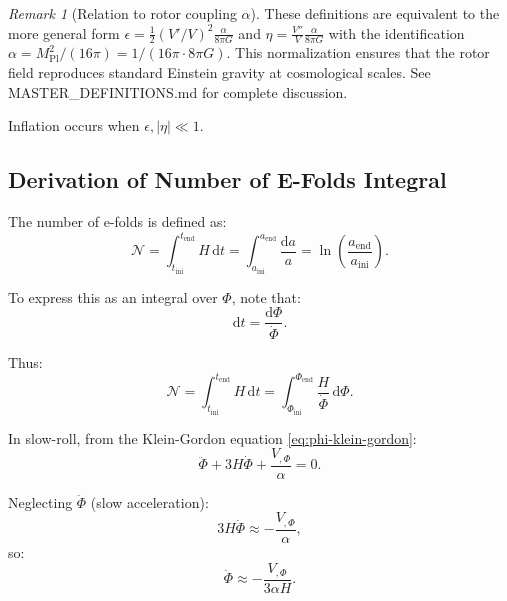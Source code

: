 \documentclass[11pt,a4paper]{article}
\numberwithin{equation}{section}
\theoremstyle{plain}
\theoremstyle{definition}
\theoremstyle{remark}
\newtheorem{remark}[theorem]{Remark}
\newcommand{\dd}{\mathrm{d}}
\begin{document}
\begin{remark}[Relation to rotor coupling $\alpha$]
These definitions are equivalent to the more general form $\epsilon = \frac{1}{2}(V'/V)^2 \frac{\alpha}{8\pi G}$ and $\eta = \frac{V''}{V}\frac{\alpha}{8\pi G}$ with the identification $\alpha = M_{\mathrm{Pl}}^2/(16\pi) = 1/(16\pi \cdot 8\pi G)$. This normalization ensures that the rotor field reproduces standard Einstein gravity at cosmological scales. See MASTER\_DEFINITIONS.md for complete discussion.
\end{remark}

Inflation occurs when $\epsilon, |\eta| \ll 1$.

\subsection{Derivation of Number of E-Folds Integral}

The number of e-folds is defined as:
\begin{equation}
\mathcal{N} = \int_{t_{\mathrm{ini}}}^{t_{\mathrm{end}}} H\,\dd t = \int_{a_{\mathrm{ini}}}^{a_{\mathrm{end}}} \frac{\dd a}{a} = \ln\left(\frac{a_{\mathrm{end}}}{a_{\mathrm{ini}}}\right).
\label{eq:efolds-def}
\end{equation}

To express this as an integral over $\Phi$, note that:
\begin{equation}
\dd t = \frac{\dd\Phi}{\dot{\Phi}}.
\end{equation}

Thus:
\begin{equation}
\mathcal{N} = \int_{t_{\mathrm{ini}}}^{t_{\mathrm{end}}} H\,\dd t = \int_{\Phi_{\mathrm{ini}}}^{\Phi_{\mathrm{end}}} \frac{H}{\dot{\Phi}}\,\dd\Phi.
\label{eq:efolds-Phi}
\end{equation}

In slow-roll, from the Klein-Gordon equation \eqref{eq:phi-klein-gordon}:
\begin{equation}
\ddot{\Phi} + 3H\dot{\Phi} + \frac{V_{,\Phi}}{\alpha} = 0.
\end{equation}

Neglecting $\ddot{\Phi}$ (slow acceleration):
\begin{equation}
3H\dot{\Phi} \approx -\frac{V_{,\Phi}}{\alpha},
\end{equation}
so:
\begin{equation}
\dot{\Phi} \approx -\frac{V_{,\Phi}}{3\alpha H}.
\label{eq:Phi-dot-slowroll}
\end{equation}
\end{document}

